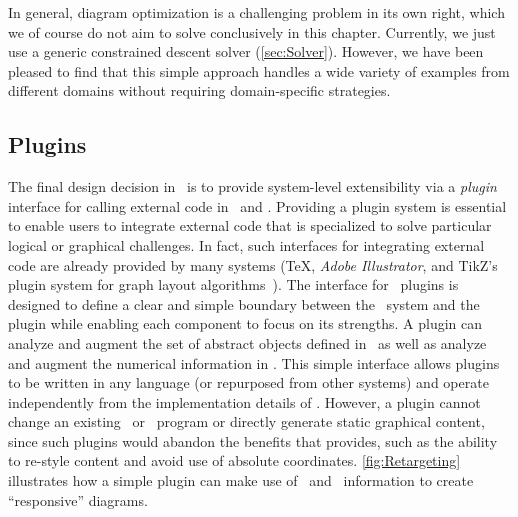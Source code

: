 In general, diagram optimization is a challenging problem in its own right, which we of course do not aim to solve conclusively in this chapter.  Currently, we just use a generic constrained descent solver (\cref{sec:Solver}).  However, we have been pleased to find that this simple approach handles a wide variety of examples from different domains without requiring domain-specific strategies.


\subsection{Plugins}
\label{sec:PlugInDesign}





The final design decision in \Penrose\ is to provide system-level extensibility via a \textit{plugin} interface for calling external code in \Substance\ and \Style. Providing a plugin system is essential to enable users to integrate external code that is specialized to solve particular logical or graphical challenges. In fact, such interfaces for integrating external code are already provided by many systems (\eg \TeX, \emph{Adobe Illustrator}, and TikZ's plugin system for graph layout algorithms~\cite{Graphviz}). The interface for \Penrose\ plugins is designed to define a clear and simple boundary between the \Penrose\ system and the plugin while enabling each component to focus on its strengths. A plugin can analyze and augment the set of abstract objects defined in \Substance\, as well as analyze and augment the numerical information in \Style. This simple interface allows plugins to be written in any language (or repurposed from other systems) and operate independently from the implementation details of \Penrose. However, a plugin cannot change an existing \Substance\ or \Style\ program or directly generate static graphical content, since such plugins would abandon the benefits that \Penrose{} provides, such as the ability to re-style content and avoid use of absolute coordinates. \cref{fig:Retargeting} illustrates how a simple plugin can make use of \Substance\ and \Style\ information to create ``responsive'' diagrams.

